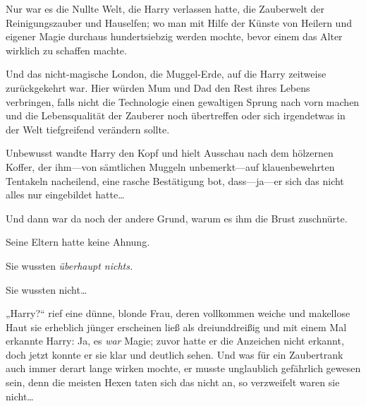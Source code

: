 Nur war es die Nullte Welt, die Harry verlassen hatte, die Zauberwelt der Reinigungszauber und Hauselfen; wo man mit Hilfe der Künste von Heilern und eigener Magie durchaus hundertsiebzig werden mochte, bevor einem das Alter wirklich zu schaffen machte.

Und das nicht-magische London, die Muggel-Erde, auf die Harry zeitweise zurückgekehrt war. Hier würden Mum und Dad den Rest ihres Lebens verbringen, falls nicht die Technologie einen gewaltigen Sprung nach vorn machen und die Lebensqualität der Zauberer noch übertreffen oder sich irgendetwas in der Welt tiefgreifend verändern sollte.

Unbewusst wandte Harry den Kopf und hielt Ausschau nach dem hölzernen Koffer, der ihm—von sämtlichen Muggeln unbemerkt—auf klauenbewehrten Tentakeln nacheilend, eine rasche Bestätigung bot, dass—ja—er sich das nicht alles nur eingebildet hatte…

Und dann war da noch der andere Grund, warum es ihm die Brust zuschnürte.

Seine Eltern hatte keine Ahnung.

Sie wussten \emph{überhaupt nichts.}

Sie wussten nicht…

„Harry?“ rief eine dünne, blonde Frau, deren vollkommen weiche und makellose Haut sie erheblich jünger erscheinen ließ als dreiunddreißig und mit einem Mal erkannte Harry: Ja, es \emph{war} Magie; zuvor hatte er die Anzeichen nicht erkannt, doch jetzt konnte er sie klar und deutlich sehen. Und was für ein Zaubertrank auch immer derart lange wirken mochte, er musste unglaublich gefährlich gewesen sein, denn die meisten Hexen taten sich das nicht an, so verzweifelt waren sie nicht…

